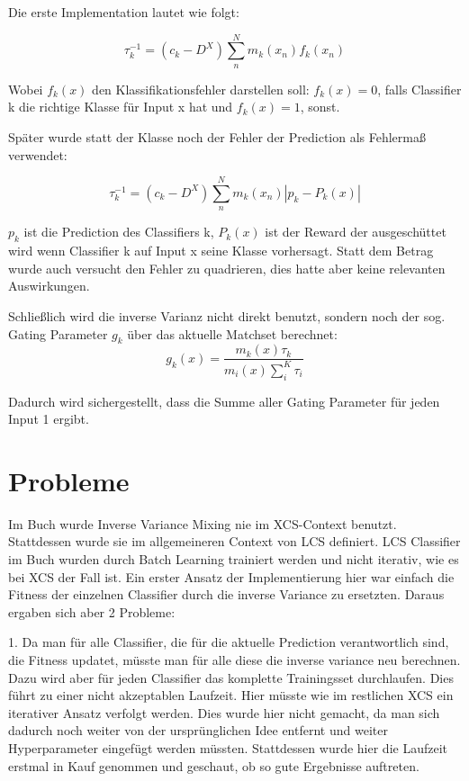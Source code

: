 \documentclass{ocsmnar}
\begin{document}
Die erste Implementation lautet wie folgt: 

$$ \tau_{k}^{-1} = (c_{k} - D^{X}) \sum_{n}^{N} m_{k}(x_{n})f_{k}(x_{n}) $$

Wobei $f_{k}(x)$ den Klassifikationsfehler darstellen soll: $f_{k}(x) = 0$, falls Classifier k die richtige Klasse für Input x hat und $f_{k}(x) = 1$, sonst. 

Später wurde statt der Klasse noch der Fehler der Prediction als Fehlermaß verwendet:

$$ \tau_{k}^{-1} = (c_{k} - D^{X}) \sum_{n}^{N} m_{k}(x_{n}) |p_{k} - P_{k}(x)|  $$

$p_{k}$ ist die Prediction des Classifiers k, $P_{k}(x)$ ist der Reward der ausgeschüttet wird wenn Classifier k auf Input x seine Klasse vorhersagt. 
Statt dem Betrag wurde auch versucht den Fehler zu quadrieren, dies hatte aber keine relevanten Auswirkungen.

Schließlich wird die inverse Varianz nicht direkt benutzt, sondern noch der sog. Gating Parameter $g_{k}$ über das aktuelle Matchset berechnet: 
$$ g_k(x) = \frac{m_k(x)\tau_k}{m_i(x)\sum_i^K \tau_i}$$

Dadurch wird sichergestellt, dass die Summe aller Gating Parameter für jeden Input 1 ergibt. 




\section{Probleme}
Im Buch wurde Inverse Variance Mixing nie im XCS-Context benutzt. Stattdessen wurde sie im allgemeineren Context von LCS definiert. LCS Classifier im Buch wurden durch Batch Learning trainiert werden und nicht iterativ, wie es bei XCS der Fall ist. 
Ein erster Ansatz der Implementierung hier war einfach die Fitness der einzelnen Classifier durch die inverse Variance zu ersetzten. 
Daraus ergaben sich aber 2 Probleme: 

1. Da man für alle Classifier, die für die aktuelle Prediction verantwortlich sind, die Fitness updatet, müsste man für alle diese die inverse variance neu berechnen. Dazu wird aber für jeden Classifier das komplette Trainingsset durchlaufen. Dies führt zu einer nicht akzeptablen Laufzeit. Hier müsste wie im restlichen XCS ein iterativer Ansatz verfolgt werden. Dies wurde hier nicht gemacht, da man sich dadurch noch weiter von der ursprünglichen Idee entfernt und weiter Hyperparameter eingefügt werden müssten. 
Stattdessen wurde hier die Laufzeit erstmal in Kauf genommen und geschaut, ob so gute Ergebnisse auftreten.  
\end{document}
